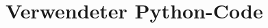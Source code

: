 \section{Verwendeter Python-Code}
\label{app:Python}
%
%
%
%
\begin{flushright}
  \textit{\autorA}
\end{flushright}
%
%
%
%
%
%
%
%
%
%
%